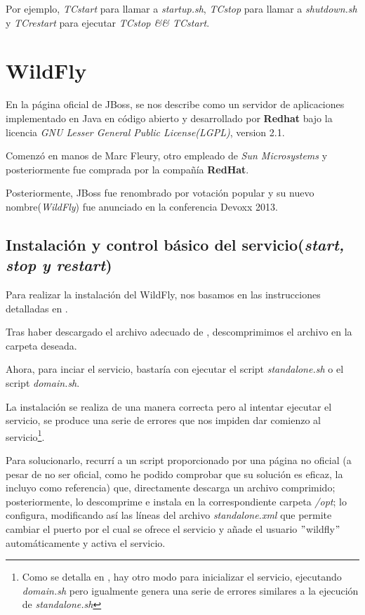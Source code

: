 \documentclass[a4paper, 10pt]{article}
\begin{document}
		Por ejemplo, \textit{TCstart} para llamar a \textit{startup.sh}, \textit{TCstop} para llamar
		a \textit{shutdown.sh} y \textit{TCrestart} para ejecutar \textit{TCstop \&\& TCstart}.
	
\section{WildFly}
	En la página oficial de JBoss\cite{WF_official}, se nos describe como un servidor de aplicaciones
	implementado en Java en código abierto y desarrollado por \textbf{Redhat} bajo la licencia
	\textit{GNU Lesser General Public License(LGPL)}, version 2.1.
	
	Comenzó en manos de Marc Fleury, otro empleado de \textit{Sun Microsystems} y posteriormente fue
	comprada por la compañía \textbf{RedHat}.

	Posteriormente, JBoss fue renombrado por votación popular\cite{WF_vote}\cite{WF_install} y su nuevo
	nombre(\textit{WildFly}) fue anunciado en la conferencia Devoxx 2013.\cite{WF_install}\cite{WF_name}

	\subsection{Instalación y control básico del servicio(\textit{start, stop y restart})}
		Para realizar la instalación del WildFly, nos basamos en las instrucciones detalladas
		en \cite{WF_install}.
		
		Tras haber descargado el archivo adecuado de \cite{WF_download}, descomprimimos el archivo
		en la carpeta deseada.
		
		Ahora, para inciar el servicio, bastaría con ejecutar el script \textit{standalone.sh}
		o el script \textit{domain.sh}.
		
		La instalación se realiza de una manera correcta pero al intentar ejecutar el servicio,
		se produce una serie de errores que nos impiden dar comienzo al servicio\footnote{Como
		se detalla en \cite{WF_install}, hay otro modo para inicializar el servicio, ejecutando
		\textit{domain.sh} pero igualmente genera una serie de errores similares a la ejecución
		de \textit{standalone.sh}}.

		Para solucionarlo, recurrí a un script proporcionado por una página no oficial \cite{WF_solution}(a
		pesar de no ser oficial, como he podido comprobar que su solución es eficaz, la incluyo como
		referencia) que, directamente descarga un archivo comprimido; posteriormente, lo descomprime e
		instala en la correspondiente carpeta \textit{/opt}; lo configura, modificando así las líneas del
		archivo \textit{standalone.xml} que permite cambiar el puerto por el cual se ofrece el servicio y
		añade el usuario $"$wildfly$"$ automáticamente y activa el servicio.
		
\end{document}
